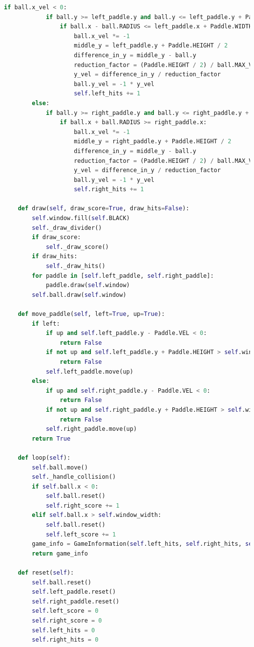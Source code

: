 \documentclass[10pt]{article}
\begin{document}
\begin{lstlisting}[language=Python, caption=game.py code]
        if ball.x_vel < 0:
            if ball.y >= left_paddle.y and ball.y <= left_paddle.y + Paddle.HEIGHT:
                if ball.x - ball.RADIUS <= left_paddle.x + Paddle.WIDTH:
                    ball.x_vel *= -1
                    middle_y = left_paddle.y + Paddle.HEIGHT / 2
                    difference_in_y = middle_y - ball.y
                    reduction_factor = (Paddle.HEIGHT / 2) / ball.MAX_VEL
                    y_vel = difference_in_y / reduction_factor
                    ball.y_vel = -1 * y_vel
                    self.left_hits += 1
        else:
            if ball.y >= right_paddle.y and ball.y <= right_paddle.y + Paddle.HEIGHT:
                if ball.x + ball.RADIUS >= right_paddle.x:
                    ball.x_vel *= -1
                    middle_y = right_paddle.y + Paddle.HEIGHT / 2
                    difference_in_y = middle_y - ball.y
                    reduction_factor = (Paddle.HEIGHT / 2) / ball.MAX_VEL
                    y_vel = difference_in_y / reduction_factor
                    ball.y_vel = -1 * y_vel
                    self.right_hits += 1

    def draw(self, draw_score=True, draw_hits=False):
        self.window.fill(self.BLACK)
        self._draw_divider()
        if draw_score:
            self._draw_score()
        if draw_hits:
            self._draw_hits()
        for paddle in [self.left_paddle, self.right_paddle]:
            paddle.draw(self.window)
        self.ball.draw(self.window)

    def move_paddle(self, left=True, up=True):
        if left:
            if up and self.left_paddle.y - Paddle.VEL < 0:
                return False
            if not up and self.left_paddle.y + Paddle.HEIGHT > self.window_height:
                return False
            self.left_paddle.move(up)
        else:
            if up and self.right_paddle.y - Paddle.VEL < 0:
                return False
            if not up and self.right_paddle.y + Paddle.HEIGHT > self.window_height:
                return False
            self.right_paddle.move(up)
        return True

    def loop(self):
        self.ball.move()
        self._handle_collision()
        if self.ball.x < 0:
            self.ball.reset()
            self.right_score += 1
        elif self.ball.x > self.window_width:
            self.ball.reset()
            self.left_score += 1
        game_info = GameInformation(self.left_hits, self.right_hits, self.left_score, self.right_score)
        return game_info

    def reset(self):
        self.ball.reset()
        self.left_paddle.reset()
        self.right_paddle.reset()
        self.left_score = 0
        self.right_score = 0
        self.left_hits = 0
        self.right_hits = 0
\end{lstlisting}
\end{document}
